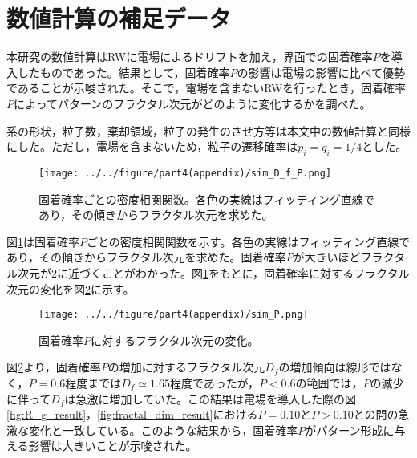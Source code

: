 \documentclass[autodetect-engine,dvi=dvipdfmx,a4paper,ja=standard,oneside,openany]{bxjsbook}
\begin{document}
\section{数値計算の補足データ}
本研究の数値計算はRWに電場によるドリフトを加え，界面での固着確率$P$を導入したものであった。結果として，固着確率$P$の影響は電場の影響に比べて優勢であることが示唆された。そこで，電場を含まないRWを行ったとき，固着確率$P$によってパターンのフラクタル次元がどのように変化するかを調べた。

系の形状，粒子数，棄却領域，粒子の発生のさせ方等は本文中の数値計算と同様にした。ただし，電場を含まないため，粒子の遷移確率は$p_i=q_i=1/4$とした。
\begin{figure}[htbp]
  \centering
  \texttt{[image: ../../figure/part4(appendix)/sim\_D\_f\_P.png]}
  \caption{固着確率ごとの密度相関関数。各色の実線はフィッティング直線であり，その傾きからフラクタル次元を求めた。}
  \label{fig:sim_D_f_P}
\end{figure}
図\ref{fig:sim_D_f_P}は固着確率$P$ごとの密度相関関数を示す。各色の実線はフィッティング直線であり，その傾きからフラクタル次元を求めた。固着確率$P$が大きいほどフラクタル次元が2に近づくことがわかった。図\ref{fig:sim_D_f_P}をもとに，固着確率に対するフラクタル次元の変化を図\ref{fig:D_f_P}に示す。
\begin{figure}[htbp]
  \centering
  \texttt{[image: ../../figure/part4(appendix)/sim\_P.png]}
  \caption{固着確率$P$に対するフラクタル次元の変化。}
  \label{fig:D_f_P}
\end{figure}
図\ref{fig:D_f_P}より，固着確率$P$の増加に対するフラクタル次元$D_f$の増加傾向は線形ではなく，$P=0.6$程度までは$D_f\simeq1.65$程度であったが，$P<0.6$の範囲では，$P$の減少に伴って$D_f$は急激に増加していた。この結果は電場を導入した際の図\ref{fig:R_g_result}，\ref{fig:fractal_dim_result}における$P=0.10$と$P>0.10$との間の急激な変化と一致している。このような結果から，固着確率$P$がパターン形成に与える影響は大きいことが示唆された。

\ifdraft{
  
  
}{}
\end{document}
